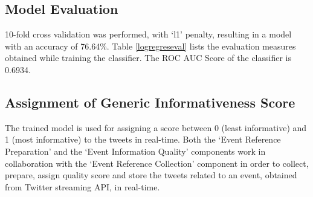 \subsection{Model Evaluation}

10-fold cross validation was performed, with `l1' penalty, resulting in a model with an accuracy of 76.64\%. Table \ref{logregreseval} lists the evaluation measures obtained while training the classifier. The ROC AUC Score of the classifier is 0.6934.

\subsection{Assignment of Generic Informativeness Score}
The trained model is used for assigning a score between 0 (least informative) and 1 (most informative) to the tweets in real-time. Both the ‘Event Reference Preparation’ and the ‘Event Information Quality’ components work in collaboration with the ‘Event Reference Collection’ component in order to collect, prepare, assign quality score and store the tweets related to an event, obtained from Twitter streaming API, in real-time.







